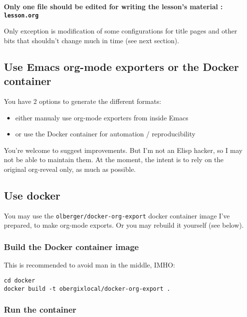 \documentclass[a4paper]{article}
\begin{document}
\textbf{Only one file should be edited for writing the lesson's material : \texttt{lesson.org}}

Only exception is modification of some configurations for title pages
and other bits that shouldn't change much in time (see next section).

\subsection{Use Emacs org-mode exporters or the Docker container}
\label{sec:org6e44972}

You have 2 options to generate the different formats:
\begin{itemize}
\item either manualy use org-mode exporters from inside Emacs
\item or use the Docker container for automation / reproducibility
\end{itemize}

\begin{NOTES}
You're welcome to suggest improvements. But I'm not an Elisp hacker,
so I may not be able to maintain them. At the moment, the intent is to
rely on the original org-reveal only, as much as possible.
\end{NOTES}

\subsection{Use docker}
\label{sec:org9903ea3}

You may use the \texttt{olberger/docker-org-export} docker container image
I've prepared, to make org-mode exports. Or you may rebuild it
yourself (see below).

\subsubsection{Build the Docker container image}
\label{sec:orgdba3f2d}

This is recommended to avoid man in the middle, IMHO:

\begin{verbatim}
cd docker
docker build -t obergixlocal/docker-org-export .
\end{verbatim}

\subsubsection{Run the container}
\label{sec:org16ca35b}
\end{document}
